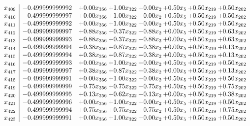 \documentclass[8pt]{article}
\begin{document}
\[\begin{array}{c| c c@{\hskip 2pt} c@{\hskip 2pt} c@{\hskip 2pt} c@{\hskip 2pt} c@{\hskip 2pt} c@{\hskip 2pt} }
 x_{409}   &  -0.499999999992 & +  0.00 x_{356} & +  1.00 x_{322} & +  0.00 x_{2} & +  0.50 x_{5} & +  0.50 x_{219} & +  0.50 x_{202}\\
 x_{410}   &  -0.499999999997 & +  0.00 x_{356} & +  1.00 x_{322} & +  0.00 x_{2} & +  0.50 x_{5} & +  0.50 x_{219} & +  0.50 x_{202}\\
 x_{411}   &  -0.499999999992 & +  0.00 x_{356} & +  1.00 x_{322} & +  0.00 x_{2} & +  0.50 x_{5} & +  0.50 x_{219} & +  0.50 x_{202}\\
 x_{412}   &  -0.499999999997 & +  0.88 x_{356} & +  0.37 x_{322} & +  0.88 x_{2} & +  0.00 x_{5} & +  0.50 x_{219} & +  0.63 x_{202}\\
 x_{413}   &  -0.499999999993 & +  0.88 x_{356} & +  0.37 x_{322} & +  0.88 x_{2} & +  0.00 x_{5} & +  0.50 x_{219} & +  0.63 x_{202}\\
 x_{414}   &  -0.499999999994 & +  0.38 x_{356} & +  0.87 x_{322} & +  0.38 x_{2} & +  0.00 x_{5} & +  0.50 x_{219} & +  0.13 x_{202}\\
 x_{415}   &  -0.499999999994 & +  0.38 x_{356} & +  0.87 x_{322} & +  0.38 x_{2} & +  0.00 x_{5} & +  0.50 x_{219} & +  0.13 x_{202}\\
 x_{416}   &  -0.499999999993 & +  0.00 x_{356} & +  1.00 x_{322} & +  0.00 x_{2} & +  0.50 x_{5} & +  0.50 x_{219} & +  0.50 x_{202}\\
 x_{417}   &  -0.499999999997 & +  0.38 x_{356} & +  0.87 x_{322} & +  0.38 x_{2} & +  0.00 x_{5} & +  0.50 x_{219} & +  0.13 x_{202}\\
 x_{418}   &  -0.499999999991 & +  0.00 x_{356} & +  1.00 x_{322} & +  0.00 x_{2} & +  0.50 x_{5} & +  0.50 x_{219} & +  0.50 x_{202}\\
 x_{419}   &  -0.499999999999 & +  0.75 x_{356} & +  0.75 x_{322} & +  0.75 x_{2} & +  0.50 x_{5} & +  0.50 x_{219} & +  0.75 x_{202}\\
 x_{420}   &  -0.499999999995 & +  0.13 x_{356} & +  0.62 x_{322} & +  0.13 x_{2} & +  0.00 x_{5} & +  0.50 x_{219} & +  0.38 x_{202}\\
 x_{421}   &  -0.499999999996 & +  0.00 x_{356} & +  1.00 x_{322} & +  0.00 x_{2} & +  0.50 x_{5} & +  0.50 x_{219} & +  0.50 x_{202}\\
 x_{422}   &  -0.499999999994 & +  0.75 x_{356} & +  0.75 x_{322} & +  0.75 x_{2} & +  0.50 x_{5} & +  0.50 x_{219} & +  0.75 x_{202}\\
 x_{423}   &  -0.499999999991 & +  0.00 x_{356} & +  1.00 x_{322} & +  0.00 x_{2} & +  0.50 x_{5} & +  0.50 x_{219} & +  0.50 x_{202}\\

\end{array}\]
\end{document}
